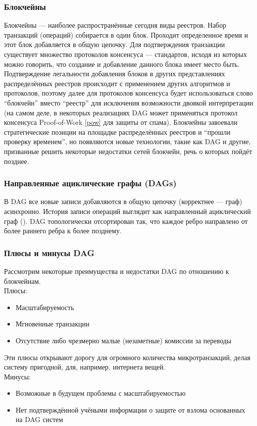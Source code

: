 \subsubsection{Блокчейны}\label{struct_block}
Блокчейны --- наиболее распространённые сегодня виды реестров. Набор транзакций
(операций) собирается в один блок. Проходит определенное время и этот блок
добавляется в общую цепочку. Для подтверждения транзакции существует множество
протоколов консенсуса --- стандартов, исходя из которых можно говорить, что
создание и добавление данного блока имеет место быть. Подтверждение легальности
добавления блоков в других представлениях распределённых реестров происходит с
применением других алгоритмов и протоколов, поэтому далее для протоколов
консенсуса будет использоваться слово ``блокчейн'' вместо ``реестр'' для
исключения возможности двоякой интерпретации (на самом деле, в некоторых
реализациях DAG \cite{Popov2018} может применяться протокол консенсуса
Proof-of-Work \ref{pow} для защиты от спама). Блокчейны завоевали
стратегические позиции на площадке распределённых реестров и ``прошли проверку
временем'', но появляются новые технологии, такие как DAG и другие, призванные
решить некоторые недостатки сетей блокчейн, речь о которых пойдёт позднее.

\subsubsection{Направленные ациклические графы (DAGs)}\label{struct_dags}
В DAG все новые записи добавляются в общую цепочку (корректнее --- граф)
асинхронно. История записи операций выглядит как направленный ациклический граф
(\cite{wikii}). DAG топологически отсортирован так, что каждое ребро направлено
от более раннего ребра к более позднему.

\subsubsection{Плюсы и минусы DAG}
Рассмотрим некоторые преимущества и недостатки DAG по отношению к блокчейнам.\\
Плюсы:
\begin{itemize}
    \item Масштабируемость
    \item Мгновенные транзакции
    \item Отсутствие либо чрезмерно малые (незаметные) комиссии за переводы
\end{itemize}
Эти плюсы открывают дорогу для огромного количества микротранзакций, делая
систему пригодной, для, например, интернета вещей.\\
Минусы:
\begin{itemize}
    \item Возможные в будущем проблемы с масштабируемостью
    \item Нет подтверждённой учёными информации о защите от взлома основанных на DAG систем
\end{itemize}


